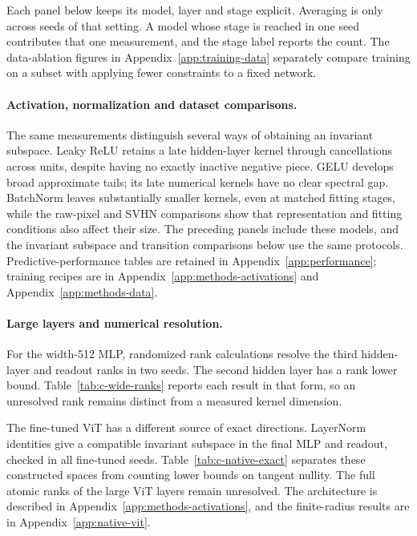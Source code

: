 Each panel below keeps its model, layer and stage explicit. Averaging is only across seeds of that setting. A model whose stage is reached in one seed contributes that one measurement, and the stage label reports the count. The data-ablation figures in Appendix~\ref{app:training-data} separately compare training on a subset with applying fewer constraints to a fixed network.







\paragraph{Activation, normalization and dataset comparisons.}\label{app:activations}\label{app:bn}\label{app:raw}\label{app:svhn}
The same measurements distinguish several ways of obtaining an invariant subspace. Leaky ReLU retains a late hidden-layer kernel through cancellations across units, despite having no exactly inactive negative piece. GELU develops broad approximate tails; its late numerical kernels have no clear spectral gap. BatchNorm leaves substantially smaller kernels, even at matched fitting stages, while the raw-pixel and SVHN comparisons show that representation and fitting conditions also affect their size. The preceding panels include these models, and the invariant subspace and transition comparisons below use the same protocols. Predictive-performance tables are retained in Appendix~\ref{app:performance}; training recipes are in Appendix~\ref{app:methods-activations} and Appendix~\ref{app:methods-data}.

\paragraph{Large layers and numerical resolution.}


For the width-512 MLP, randomized rank calculations resolve the third hidden-layer and readout ranks in two seeds. The second hidden layer has a rank lower bound. Table~\ref{tab:c-wide-ranks} reports each result in that form, so an unresolved rank remains distinct from a measured kernel dimension.


The fine-tuned ViT has a different source of exact directions. LayerNorm identities give a compatible invariant subspace in the final MLP and readout, checked in all fine-tuned seeds. Table~\ref{tab:c-native-exact} separates these constructed spaces from counting lower bounds on tangent nullity. The full atomic ranks of the large ViT layers remain unresolved. The architecture is described in Appendix~\ref{app:methods-activations}, and the finite-radius results are in Appendix~\ref{app:native-vit}.


